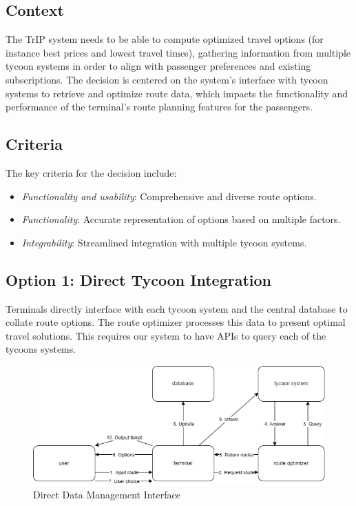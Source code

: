 \subsection*{Context}
The TrIP system needs to be able to compute optimized travel options (for instance best prices and lowest travel times), gathering information from multiple tycoon systems in order to align with passenger preferences and existing subscriptions.
The decision is centered on the system's interface with tycoon systems to retrieve and optimize route data, which impacts the functionality and performance of the terminal's route planning features for the passengers.

\subsection*{Criteria}
The key criteria for the decision include:
\begin{itemize}
    \item \textit{Functionality and usability}: Comprehensive and diverse route options.
    \item \textit{Functionality}: Accurate representation of options based on multiple factors.
    \item \textit{Integrability}: Streamlined integration with multiple tycoon systems.
\end{itemize}

\subsection*{Option 1: Direct Tycoon Integration}
Terminals directly interface with each tycoon system and the central database to collate route options. The route optimizer processes this data to present optimal travel solutions. This requires our system to have APIs to query each of the tycoons systems.
\begin{figure}[ht]
    \centering
    \includegraphics[width=\textwidth]{drawings/decision3_drawings/direct.png}
    \caption{Direct Data Management Interface}
    \label{fig:direct-data-interface}
\end{figure}

